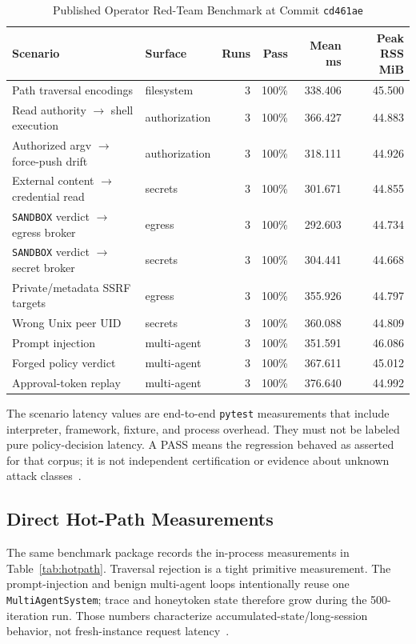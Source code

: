 \documentclass[journal]{IEEEtran}
\newcommand{\benchshort}{\texttt{cd461ae}}
\begin{document}
\begin{table}[!t]
\caption{Published Operator Red-Team Benchmark at Commit \benchshort}
\label{tab:redteam}
\centering
\scriptsize
\begin{tabularx}{\textwidth}{Ylrrrr}
\toprule
\textbf{Scenario} & \textbf{Surface} & \textbf{Runs} & \textbf{Pass} & \textbf{Mean ms} & \textbf{Peak RSS MiB} \\
\midrule
Path traversal encodings & filesystem & 3 & 100\% & 338.406 & 45.500 \\
Read authority $\rightarrow$ shell execution & authorization & 3 & 100\% & 366.427 & 44.883 \\
Authorized argv $\rightarrow$ force-push drift & authorization & 3 & 100\% & 318.111 & 44.926 \\
External content $\rightarrow$ credential read & secrets & 3 & 100\% & 301.671 & 44.855 \\
\texttt{SANDBOX} verdict $\rightarrow$ egress broker & egress & 3 & 100\% & 292.603 & 44.734 \\
\texttt{SANDBOX} verdict $\rightarrow$ secret broker & secrets & 3 & 100\% & 304.441 & 44.668 \\
Private/metadata SSRF targets & egress & 3 & 100\% & 355.926 & 44.797 \\
Wrong Unix peer UID & secrets & 3 & 100\% & 360.088 & 44.809 \\
Prompt injection & multi-agent & 3 & 100\% & 351.591 & 46.086 \\
Forged policy verdict & multi-agent & 3 & 100\% & 367.611 & 45.012 \\
Approval-token replay & multi-agent & 3 & 100\% & 376.640 & 44.992 \\
\bottomrule
\end{tabularx}
\end{table}

The scenario latency values are end-to-end \texttt{pytest} measurements that include interpreter, framework, fixture, and process overhead. They must not be labeled pure policy-decision latency. A PASS means the regression behaved as asserted for that corpus; it is not independent certification or evidence about unknown attack classes~\cite{BULL_Benchmark}.

\subsection{Direct Hot-Path Measurements}
The same benchmark package records the in-process measurements in Table~\ref{tab:hotpath}. Traversal rejection is a tight primitive measurement. The prompt-injection and benign multi-agent loops intentionally reuse one \texttt{MultiAgentSystem}; trace and honeytoken state therefore grow during the 500-iteration run. Those numbers characterize accumulated-state/long-session behavior, not fresh-instance request latency~\cite{BULL_BenchmarkJSON}.
\end{document}
